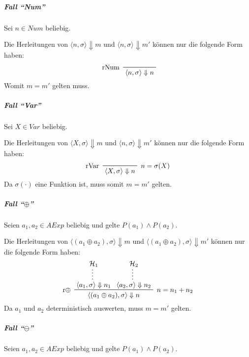 \documentclass[a4paper, 11pt, accentcolor = tud3b]{tudreport}
\begin{document}
		 		    \subparagraph{Fall \enquote{Num}}
			 		    Sei $ n \in \textit{Num} $ beliebig.
		 		    
			 		    Die Herleitungen von $ \langle n, \sigma \rangle \Downarrow m $ und $ \langle n, \sigma \rangle \Downarrow m' $ können nur die folgende Form haben:
			 		    \begin{equation*}
				 		    \prftree[l]
					 		    { rNum }
					 		    { \langle n, \sigma \rangle \Downarrow n }
			 		    \end{equation*}
			 		    Womit $ m = m' $ gelten muss.
		 		    
		 		    \subparagraph{Fall \enquote{Var}}
			 		    Sei $ X \in \textit{Var} $ beliebig.
		 		    
			 		    Die Herleitungen von $ \langle X, \sigma \rangle \Downarrow m $ und $ \langle n, \sigma \rangle \Downarrow m' $ können nur die folgende Form haben:
			 		    \begin{equation*}
				 		    \prftree[l, r]
					 		    { $ n = \sigma(X) $ }
					 		    { rVar }
					 		    { \langle X, \sigma \rangle \Downarrow n }
			 		    \end{equation*}
			 		    Da $ \sigma(\cdot) $ eine Funktion ist, muss somit $ m = m' $ gelten.
		 		    
		 		    \subparagraph{Fall \enquote{$ \oplus $}}
			 		    Seien $ a _ 1, a _ 2 \in \textit{AExp} $ beliebig und gelte $ P(a _ 1) \land P(a _ 2) $.
			 		    
			 		    Die Herleitungen von $ \langle (a _ 1 \oplus a _ 2), \sigma \rangle \Downarrow m $ und $ \langle (a _ 1 \oplus a _ 2), \sigma \rangle \Downarrow m' $ können nur die folgende Form haben:
			 		    \begin{equation*}
				 		    \prftree[l, r]
					 		    { $ n = n _ 1 + n _ 2 $ }
					 		    { r$ \oplus $ }
					 		    { \prfsummary{\mathcal{H} _ 1}{\langle a _ 1, \sigma \rangle \Downarrow n _ 1} }
					 		    { \prfsummary{\mathcal{H} _ 2}{\langle a _ 2, \sigma \rangle \Downarrow n _ 2} }
					 		    { \langle (a _ 1 \oplus a _ 2), \sigma \rangle \Downarrow n }
			 		    \end{equation*}
			 		    Da $ a _ 1 $ und $ a _ 2 $ deterministisch auswerten, muss $ m = m' $ gelten.
		 		    
		 		    \subparagraph{Fall \enquote{$ \ominus $}}
			 		    Seien $ a _ 1, a _ 2 \in \textit{AExp} $ beliebig und gelte $ P(a _ 1) \land P(a _ 2) $.
			 		    
\end{document}
